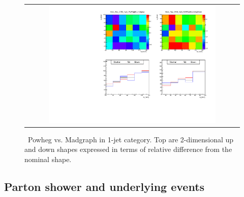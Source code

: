 \begin{figure}[htp]
\centering
\begin{tabular}{c}
\includegraphics[width=0.8\textwidth]{figures/histo_Top_CMS_hww_MVATopBounding_1j_zoom.pdf}
\end{tabular}
\caption{ \topbkg\ Powheg vs. Madgraph in 1-jet category.
         Top are 2-dimensional up and down shapes expressed in terms of relative 
         difference from the nominal shape.}
\label{fig:alter_top}
\end{figure}

\subsection{Parton shower and underlying events}

